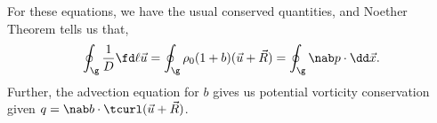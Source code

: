 \noindent
For these equations, we have the usual conserved quantities, and Noether Theorem tells us that,
$$ \oint_{\g} \frac{1}{D}\fd \ell {\vec u} = \oint_{\g} \rho_0 (1 + b)(\vec u + \vec R)  = \oint_{\g} \nab p \cdot \dd \vec x. $$
Further, the advection equation for $b$ gives us potential vorticity conservation given $q = \nab b \cdot \tcurl(\vec u + \vec R)$.
